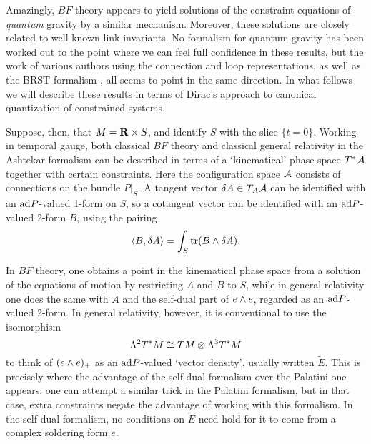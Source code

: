 Amazingly, $BF$ theory appears to yield solutions of the constraint
equations of {\it quantum} gravity by a similar mechanism.  Moreover,
these solutions are closely related to well-known link invariants.  No
formalism for quantum gravity has been worked out to the point where we
can feel full confidence in these results, but the work of various
authors using the connection \cite{Kodama} and loop \cite{BGP}
representations, as well as the BRST formalism \cite{CS}, all seems to
point in the same direction.  In what follows we will describe these
results in terms of Dirac's approach to canonical quantization of
constrained systems.

Suppose, then, that $M = {\bf R} \times S$, and identify $S$ with the slice
$\{t = 0\}$.  Working in temporal gauge, both classical $BF$ theory and
classical general relativity in the Ashtekar formalism can be described
in terms of a `kinematical' phase space $T^\ast \A$ together with
certain constraints.  Here the configuration space $\A$ consists of
connections on the bundle $P|_S$.  A tangent vector $\delta A \in T_A
\A$ can be identified with an ${\rm ad} P$-valued 1-form on $S$, so a
cotangent vector can be identified with an ${\rm ad} P$-valued 2-form $B$,
using the pairing
\[       \langle B, \delta A\rangle = \int_S  {\rm tr}(B \wedge \delta A) .\]

In $BF$ theory, one obtains a point in the kinematical phase space from
a solution of the equations of motion by restricting $A$ and $B$ to $S$,
while in general relativity one does the same with $A$ and the self-dual
part of $e \wedge e$, regarded as an ${\rm ad} P$-valued 2-form.  In general
relativity, however, it is conventional to use the isomorphism
\[
\Lambda^2 T^\ast M \cong TM \otimes \Lambda^3 T^\ast M \]
to think of $(e \wedge e)_+$ as an ${\rm ad} P$-valued `vector density', usually
written $\tilde E$.  This is precisely where the advantage of the
self-dual formalism over the Palatini one appears: one can attempt a
similar trick in the Palatini formalism, but in that case, extra
constraints negate the advantage of working with this formalism.  In the
self-dual formalism, no conditions on $\tilde E$ need hold for it to
come from a complex soldering form $e$.

